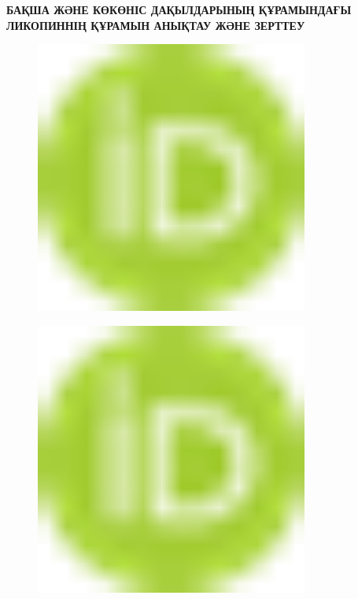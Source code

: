 
{\bfseries БАҚША ЖӘНЕ КӨКӨНІС ДАҚЫЛДАРЫНЫҢ ҚҰРАМЫНДАҒЫ ЛИКОПИННІҢ ҚҰРАМЫН
АНЫҚТАУ ЖӘНЕ ЗЕРТТЕУ}

\begin{figure}[H]
	\centering
	\includegraphics[width=0.8\textwidth]{media/pish2/image1}
	\caption*{}
\end{figure}

\begin{figure}[H]
	\centering
	\includegraphics[width=0.8\textwidth]{media/pish2/image1}
	\caption*{}
\end{figure}


